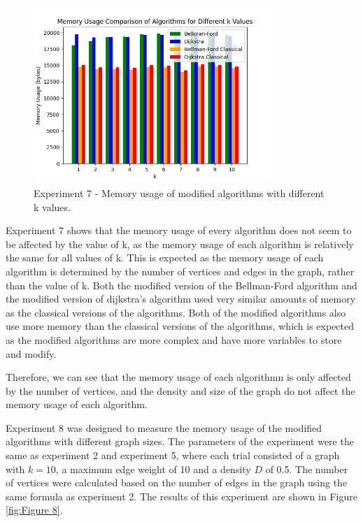 \documentclass{article}
\begin{document}
\begin{onehalfspace}
\begin{figure}[H] 
    \centering
    \includegraphics[width=0.8\textwidth]{Figures/Memory_kvals.png} 
    \caption{\footnotesize Experiment 7 - Memory usage of modified algorithms with different k values.}
    \label{fig:Figure 7} 
\end{figure}

Experiment 7 shows that the memory usage of every algorithm does not seem to be affected by the value of k, as the 
memory usage of each algorithm is relatively the same for all values of k. This is expected as the memory usage of each algorithm is determined by the number of vertices and edges in the graph, rather than the value of k.
Both the modified version of the Bellman-Ford algorithm and the modified version of dijkstra's algorithm used very similar amounts of memory as the classical versions of the algorithms.
Both of the modified algorithms also use more memory than the classical versions of the algorithms,
which is expected as the modified algorithms are more complex and have more variables to store and modify.
\smallskip
\newline
\indent

Therefore, we can see that the memory usage of each algorithmn is only affected by the number of vertices, and the density and size of the graph do not affect the memory usage of each algorithm.

Experiment 8 was designed to measure the memory usage of the modified algorithms with different graph sizes. The parameters of the experiment were the same as experiment 2 and experiment 5, where each trial consisted of a graph with $k=10$, a maximum edge weight of 10 and a density $D$ of 0.5. The number of vertices were calculated based on the number of edges in the graph using the same formula as experiment 2.
The results of this experiment are shown in Figure \ref{fig:Figure 8}.


\end{onehalfspace}
\end{document}
